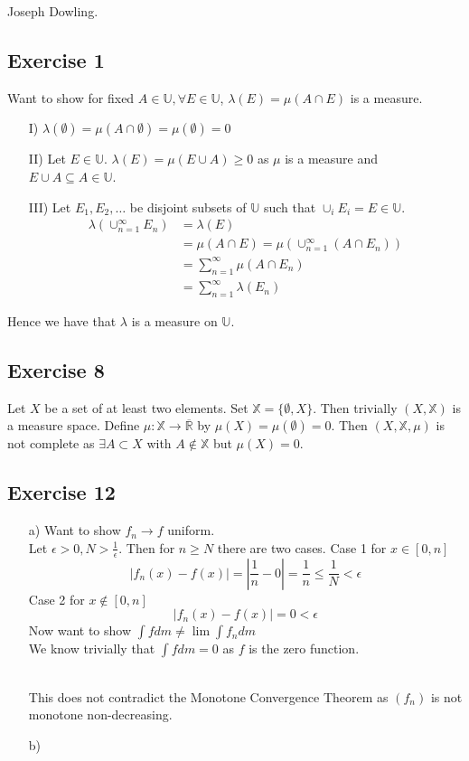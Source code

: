 \documentclass[a4paper, 12pt, twoside]{article}
\author{Joseph}
\begin{document}
Joseph Dowling.
\subsection*{Exercise 1}
Want to show for fixed $A\in \mathbb{U},\forall E\in \mathbb{U}$, $\lambda(E)=\mu(A\cap E)$ is a measure.
\begin{itemize}
    \item[I)] $\lambda(\emptyset)=\mu(A\cap\emptyset)=\mu(\emptyset)=0$
    \item[II)] Let $E\in \mathbb{U}$. $\lambda(E)=\mu(E\cup A)\geq 0$ as $\mu$ is a measure and $E\cup A \subseteq A\in \mathbb{U} $.
    \item[III)] Let $E_{1},E_{2},\dots$ be disjoint subsets of $\mathbb{U}$ such that $\cup_{i}E_{i}=E\in \mathbb{U}$.
    \begin{align*}
        \lambda(\cup_{n=1}^{\infty}E_{n}) &= \lambda(E)\\
        & = \mu(A\cap E) = \mu(\cup_{n=1}^{\infty}(A\cap E_{n}))\\
        & = \sum_{n=1}^{\infty}\mu(A\cap E_{n})\\
        & = \sum_{n=1}^{\infty}\lambda(E_{n})
    \end{align*}
\end{itemize}
Hence we have that $\lambda$ is a measure on $\mathbb{U}$.
\subsection*{Exercise 8}
Let $X$ be a set of at least two elements. Set $\mathbb{X}=\{\emptyset,X\}$. Then trivially $(X,\mathbb{X})$ is a measure space. Define $\mu:\mathbb{X}\to\overline{\mathbb{R}}$ by $\mu(X)=\mu(\emptyset)=0$. Then $(X,\mathbb{X},\mu)$ is not complete as $\exists A\subset X$ with $A\not\in \mathbb{X}$ but $\mu(X)=0$.
\subsection*{Exercise 12}
\begin{itemize}
    \item[a)]
    Want to show $f_{n}\to f$ uniform.\\
    Let $\epsilon>0, N>\frac{1}{\epsilon}$. Then for $n\geq N$ there are two cases. Case 1 for $x\in[0,n]$\\
    $$|f_{n}(x)-f(x)|=|\frac{1}{n}-0|=\frac{1}{n}\leq\frac{1}{N}<\epsilon$$
    Case 2 for $x\not\in[0,n]$
    $$|f_{n}(x)-f(x)|=0<\epsilon $$
    Now want to show $\int fdm\neq \lim\int f_{n}dm$\\
    We know trivially that $\int fdm=0$ as $f$ is the zero function.


    \\This does not contradict the Monotone Convergence Theorem as $(f_{n})$ is not monotone non-decreasing.
    \item[b)]

\end{itemize}
\end{document}
